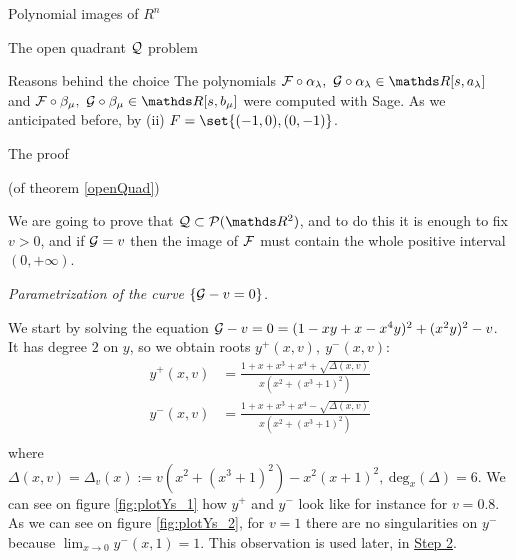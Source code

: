 \documentclass[11pt, a4paper, english, twoside, notitlepage]{report}
\begin{document}
\begin{chapter}{Polynomial images of $R^n$}
\begin{section}{The open quadrant $\mathcal{Q}$ problem}
\begin{subsection}{Reasons behind the choice}
		The polynomials $\F\circ\alpha_{\lambda },\ \G\circ\alpha_{\lambda} \in \R[s,a_{\lambda}]$ and $\F\circ\beta_{\mu},\ \G\circ\beta_{\mu} \in\R[s,b_{\mu}]$ were computed with Sage. As we anticipated before, by (ii) $F = \set{(-1, 0), (0, -1)}$.
		
	\end{subsection}
	
	\begin{subsection}{The proof}
		
		\begin{Proof}(of theorem \ref{openQuad})
			
			We are going to prove that $\Qu \subset \P(\R^2)$, and to do this it is enough to fix $v > 0$, and if $\mathcal{G} = v$ then the image of $\mathcal{F}$ must contain the whole positive interval $(0, +\infty)$.
			\begin{center}
				 \emph{Parametrization of the curve $\{\mathcal{G}-v=0\}$.}
			\end{center}\label{step1}

			We start by solving the equation $\mathcal{G}-v= 0 = (1 - xy + x - x^4 y)^2 + (x^2 y)^2 - v$. It has degree $2$ on $y$, so we obtain roots $y^+(x,v),\ y^-(x,v)$:
			\begin{equation*}
				\begin{aligned}
				y^+(x,v) & =\frac{1 + x + x^3 + x^4 + \sqrt{\Delta(x,v)}}{x(x^2 + (x^3 + 1)^2)}\\
				y^-(x,v) & =\frac{1 + x + x^3 + x^4 - \sqrt{\Delta(x,v)}}{x(x^2 + (x^3 + 1)^2)}\\
				\end{aligned}
			\end{equation*}
			where $\Delta(x,v) = \Delta_v(x):=v(x^2+(x^3+1)^2)-x^2(x+1)^2,\ \text{deg}_x(\Delta) = 6$. We can see on figure \ref{fig:plotYs_1} how $y^+$ and $y^-$ look like for instance for $v = 0.8$. As we can see on figure \ref{fig:plotYs_2}, for $v = 1$ there are no singularities on $y^-$ because $\lim_{x\rightarrow0} y^-(x, 1) = 1$. This observation is used later, in \hyperref[step2]{Step 2}.
			

\end{Proof}
\end{subsection}
\end{section}
\end{chapter}
\end{document}
